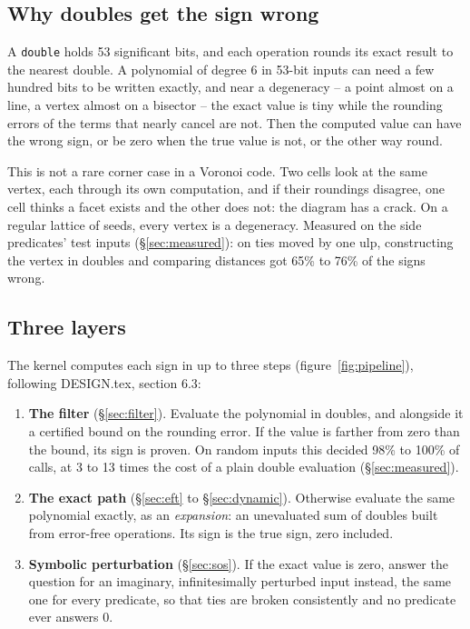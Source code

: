 \documentclass[11pt,a4paper]{article}
\newcommand{\code}[1]{\texttt{#1}}
\newcommand{\secref}[1]{\S\ref{#1}}
\theoremstyle{definition}
\theoremstyle{remark}
\begin{document}
\subsection{Why doubles get the sign wrong}

A \code{double} holds 53 significant bits, and each operation rounds its exact result to the
nearest double. A polynomial of degree 6 in 53-bit inputs can need a few hundred bits to be
written exactly, and near a degeneracy -- a point almost on a line, a vertex almost on a
bisector -- the exact value is tiny while the rounding errors of the terms that nearly cancel
are not. Then the computed value can have the wrong sign, or be zero when the true value is
not, or the other way round.

This is not a rare corner case in a Voronoi code. Two cells look at the same vertex, each
through its own computation, and if their roundings disagree, one cell thinks a facet exists
and the other does not: the diagram has a crack. On a regular lattice of seeds, every vertex is
a degeneracy. Measured on the side predicates' test inputs (\secref{sec:measured}): on ties
moved by one ulp, constructing the vertex in doubles and comparing distances got 65\% to 76\% of
the signs wrong.

\subsection{Three layers}

The kernel computes each sign in up to three steps (figure~\ref{fig:pipeline}), following
DESIGN.tex, section 6.3:

\begin{enumerate}
  \item \textbf{The filter} (\secref{sec:filter}). Evaluate the polynomial in doubles, and
    alongside it a certified bound on the rounding error. If the value is farther from zero
    than the bound, its sign is proven. On random inputs this decided 98\% to 100\% of calls, at
    3 to 13 times the cost of a plain double evaluation (\secref{sec:measured}).
  \item \textbf{The exact path} (\secref{sec:eft} to \secref{sec:dynamic}). Otherwise evaluate
    the same polynomial exactly, as an \emph{expansion}: an unevaluated sum of doubles built
    from error-free operations. Its sign is the true sign, zero included.
  \item \textbf{Symbolic perturbation} (\secref{sec:sos}). If the exact value is zero, answer
    the question for an imaginary, infinitesimally perturbed input instead, the same one for
    every predicate, so that ties are broken consistently and no predicate ever answers 0.
\end{enumerate}
\end{document}
